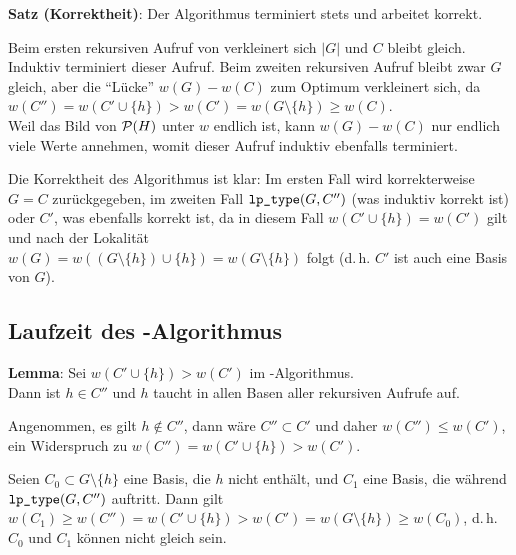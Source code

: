 \textbf{Satz (Korrektheit)}:
Der Algorithmus terminiert stets und arbeitet korrekt.

\begin{Beweis}
    Beim ersten rekursiven Aufruf von  verkleinert sich $|G|$ und $C$ bleibt gleich.
    Induktiv terminiert dieser Aufruf.
    Beim zweiten rekursiven Aufruf bleibt zwar $G$ gleich, aber die "`Lücke"' $w(G) - w(C)$
    zum Optimum verkleinert sich, da\\
    $w(C'') = w(C' \cup \{h\}) > w(C') = w(G \setminus \{h\}) \ge w(C)$.\\
    Weil das Bild von $\P(H)$ unter $w$ endlich ist, kann $w(G) - w(C)$ nur endlich viele Werte
    annehmen, womit dieser Aufruf induktiv ebenfalls terminiert.

    Die Korrektheit des Algorithmus ist klar:
    Im ersten Fall wird korrekterweise $G = C$ zurückgegeben,
    im zweiten Fall $\code{lp\_type}(G, C'')$ (was induktiv korrekt ist) oder
    $C'$, was ebenfalls korrekt ist, da in diesem Fall $w(C' \cup \{h\}) = w(C')$ gilt und nach
    der Lokalität\\
    $w(G) = w((G \setminus \{h\}) \cup \{h\}) = w(G \setminus \{h\})$ folgt
    (d.\,h. $C'$ ist auch eine Basis von $G$).
\end{Beweis}

\pagebreak

\subsection{%
    Laufzeit des -Algorithmus%
}

\textbf{Lemma}:
Sei $w(C' \cup \{h\}) > w(C')$ im -Algorithmus.\\
Dann ist $h \in C''$ und $h$ taucht in allen Basen aller rekursiven Aufrufe auf.

\begin{Beweis}
    Angenommen, es gilt $h \notin C''$,
    dann wäre $C'' \subset C'$ und daher $w(C'') \le w(C')$,
    ein Widerspruch zu $w(C'') = w(C' \cup \{h\}) > w(C')$.

    Seien $C_0 \subset G \setminus \{h\}$ eine Basis, die $h$ nicht enthält,
    und $C_1$ eine Basis, die während $\code{lp\_type}(G, C'')$ auftritt.
    Dann gilt $w(C_1) \ge w(C'') = w(C' \cup \{h\}) > w(C') = w(G \setminus \{h\}) \ge w(C_0)$,
    d.\,h. $C_0$ und $C_1$ können nicht gleich sein.
\end{Beweis}

\linie

